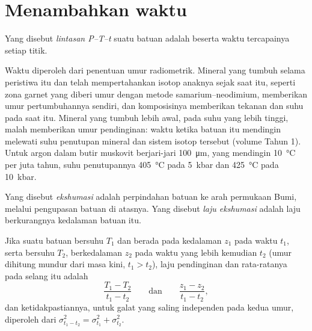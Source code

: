 \section{Menambahkan waktu}\label{sec:b2:pt-paths:time}

\begin{definition}[Lintasan P--T--t]\label{def:b2:pt-paths:ptt}
Yang disebut \emph{lintasan P--T--t} suatu batuan adalah  beserta waktu
tercapainya setiap titik.
\end{definition}

Waktu diperoleh dari penentuan umur radiometrik. Mineral yang tumbuh selama peristiwa itu dan telah mempertahankan
isotop anaknya sejak saat itu, seperti zona garnet yang diberi umur dengan metode
samarium--neodimium, memberikan umur pertumbuhannya sendiri, dan
komposisinya memberikan tekanan dan suhu pada saat itu. Mineral yang tumbuh
lebih awal, pada suhu yang lebih tinggi, malah memberikan umur pendinginan: waktu ketika batuan itu
mendingin melewati suhu penutupan mineral dan sistem isotop tersebut (volume
Tahun 1). Untuk argon dalam butir muskovit berjari-jari \qty{100}{\micro m}, yang mendingin
\qty{10}{\celsius} per juta tahun, suhu penutupannya \qty{405}{\celsius} pada
\qty{5}{kbar} dan \qty{425}{\celsius} pada \qty{10}{kbar}.

\begin{definition}\label{def:b2:pt-paths:exhumation}
Yang disebut \emph{ekshumasi} adalah perpindahan batuan ke arah permukaan Bumi,
melalui pengupasan batuan di atasnya. Yang disebut \emph{laju ekshumasi} adalah
laju berkurangnya kedalaman batuan itu.
\end{definition}

\begin{proposition}\label{prop:b2:pt-paths:rates}
Jika suatu batuan bersuhu $T_1$ dan berada pada kedalaman $z_1$ pada waktu $t_1$, serta bersuhu $T_2$, berkedalaman $z_2$ pada
waktu yang lebih kemudian $t_2$ (umur dihitung mundur dari masa kini, $t_1 > t_2$), laju pendinginan dan
 rata-ratanya pada selang itu adalah
\[
\frac{T_1 - T_2}{t_1 - t_2}
\qquad\text{dan}\qquad
\frac{z_1 - z_2}{t_1 - t_2},
\]
dan ketidakpastiannya, untuk galat yang saling independen pada kedua umur, diperoleh dari
$\sigma_{t_1 - t_2}^2 = \sigma_{t_1}^2 + \sigma_{t_2}^2$.
\end{proposition}

